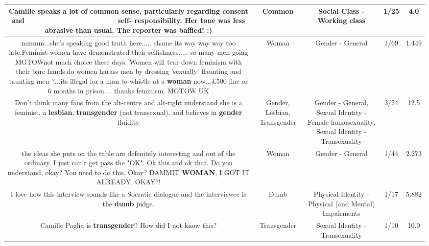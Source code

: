 \documentclass[11pt]{article}
\newlength\mylength
\begin{document}
\begin{center}
\begin{longtable}{|C{.65\mylength}|C{.30\mylength}|C{.12\mylength}|C{.12\mylength}|C{.12\mylength}|}
  \small Camille speaks a lot of \textbf{common} sense, particularly regarding consent and                        self- responsibility. Her tone was less abrasive than usual. The reporter was baffled! :)\normalsize   & Common & Social Class - Working class & 1/25 & 4.0 \\  \hline
  \small mmmm...she's speaking good truth here..... shame its way way way too late.Feminist women have demonstrated their selfishness..... so many men going MGTOWnot much choice these days. Women will tear down feminism with their bare hands.do women harass men by dressing 'sexually' flaunting and taunting men ?...its illegal for a man to whistle at a \textbf{woman} now...£500 fine or 6 months in prison.... thanks feminism. MGTOW UK\normalsize   & Woman & Gender - General & 1/69 & 1.449 \\  \hline
  \small Don't think many fans from the alt-centre and alt-right understand she is a feminist, a \textbf{lesbian}, \textbf{transgender} (not transexual), and believes in \textbf{gender} fluidity\normalsize   & Gender, Lesbian, Transgender & Gender - General, Sexual Identity - Female homosexuality, Sexual Identity - Transexuality & 3/24 & 12.5 \\  \hline
  \small the ideas she puts on the table are defenitely interesting and out of the ordinary. I just can't get pass the "OK". Ok this and ok that. Do you understand, okay? You need to do this, Okay? DAMMIT \textbf{WOMAN}, I GOT IT ALREADY, OKAY?!\normalsize   & Woman & Gender - General & 1/44 & 2.273 \\  \hline
  \small I love how this interview sounds like a Socratic dialogue and the interviewee is the \textbf{dumb} judge.\normalsize   & Dumb & Physical Identity - Physical (and Mental) Impairments & 1/17 & 5.882 \\  \hline
  \small Camille Paglia is \textbf{transgender}!! How did I not know this?\normalsize   & Transgender & Sexual Identity - Transexuality & 1/10 & 10.0 \\  \hline

\end{longtable}
\end{center}
\end{document}
